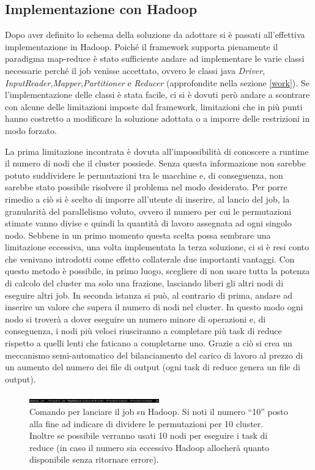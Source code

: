 \documentclass[]{IEEEtran}
\begin{document}
\subsection{Implementazione con Hadoop}
Dopo aver definito lo schema della soluzione da adottare si è passati all'effettiva implementazione in Hadoop. Poiché il framework supporta pienamente il paradigma map-reduce è stato sufficiente andare ad implementare le varie classi necessarie perché il job venisse accettato, ovvero le classi java \emph{Driver}, \emph{InputReader},\emph{Mapper},\emph{Partitioner} e \emph{Reducer} (approfondite nella sezione \ref{work}). Se l'implementazione delle classi è stata facile, ci si è dovuti però andare a scontrare con alcune delle limitazioni imposte dal framework, limitazioni che in più punti hanno costretto a modificare la soluzione adottata o a imporre delle restrizioni in modo forzato.

La prima limitazione incontrata è dovuta all'impossibilità di conoscere a runtime il numero di nodi che il cluster possiede. Senza questa informazione non sarebbe potuto suddividere le permutazioni tra le macchine e, di conseguenza, non sarebbe stato possibile risolvere il problema nel modo desiderato. Per porre rimedio a ciò si è scelto di imporre all'utente di inserire, al lancio del job, la granularità del parallelismo voluto, ovvero il numero per cui le permutazioni stimate vanno divise e quindi la quantità di lavoro assegnata ad ogni singolo nodo. Sebbene in un primo momento questa scelta possa sembrare una limitazione eccessiva, una volta implementata la terza soluzione, ci si è resi conto che venivano introdotti come effetto collaterale due importanti vantaggi. Con questo metodo è possibile, in primo luogo, scegliere di non usare tutta la potenza di calcolo del cluster ma solo una frazione, lasciando liberi gli altri nodi di eseguire altri job. In seconda istanza si può, al contrario di prima, andare ad inserire un valore che supera il numero di nodi nel cluster. In questo modo ogni nodo si troverà a dover eseguire un numero minore di operazioni e, di conseguenza, i nodi più veloci riusciranno a completare più task di reduce rispetto a quelli lenti che faticano a completarne uno. Grazie a ciò si crea un meccanismo semi-automatico del bilanciamento del carico di lavoro al prezzo di un aumento del numero dei file di output (ogni task di reduce genera un file di output).
\begin{figure}
	\centering
	\includegraphics[width=0.5\textwidth]{images/exec.png}
	\caption{Comando per lanciare il job su Hadoop. Si noti il numero ``10'' posto alla fine ad indicare di dividere le permutazioni per 10 cluster. Inoltre se possibile verranno usati 10 nodi per eseguire i task di reduce (in caso il numero sia eccessivo Hadoop allocherà quanto disponibile senza ritornare errore).}
\end{figure}
\end{document}
